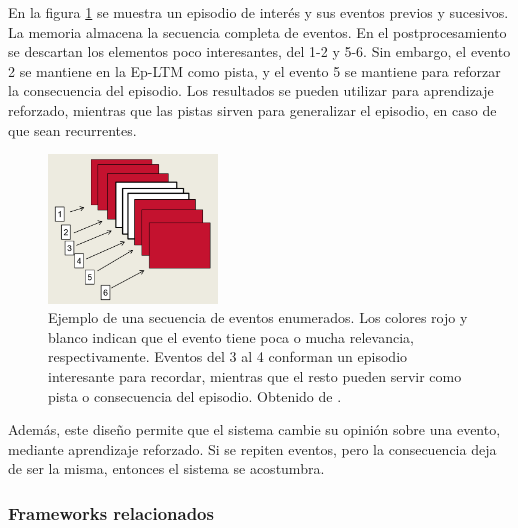 En la figura \ref{img:sleep_eventos} se muestra un episodio de interés y sus eventos previos y sucesivos. La memoria almacena la secuencia completa de eventos. En el postprocesamiento se descartan los elementos poco interesantes, del 1-2 y 5-6. Sin embargo, el evento 2 se mantiene en la Ep-LTM como pista, y el evento 5 se mantiene para reforzar la consecuencia del episodio. Los resultados se pueden utilizar para aprendizaje reforzado, mientras que las pistas sirven para generalizar el episodio, en caso de que sean recurrentes.

\begin{figure}[H]
\centering
\includegraphics[width=0.4\textwidth]{./figures/eventos.png}
\caption{\small Ejemplo de una secuencia de eventos enumerados. Los colores rojo y blanco indican que el evento tiene poca o mucha relevancia, respectivamente. Eventos del 3 al 4 conforman un episodio interesante para recordar, mientras que el resto pueden servir como pista o consecuencia del episodio. Obtenido de \cite{Kelley2014}.}
\label{img:sleep_eventos}
\end{figure}







Además, este diseño permite que el sistema cambie su opinión sobre una evento, mediante aprendizaje reforzado. Si se repiten eventos, pero la consecuencia deja de ser la misma, entonces el sistema se acostumbra.

\subsubsection{Frameworks relacionados}
%

